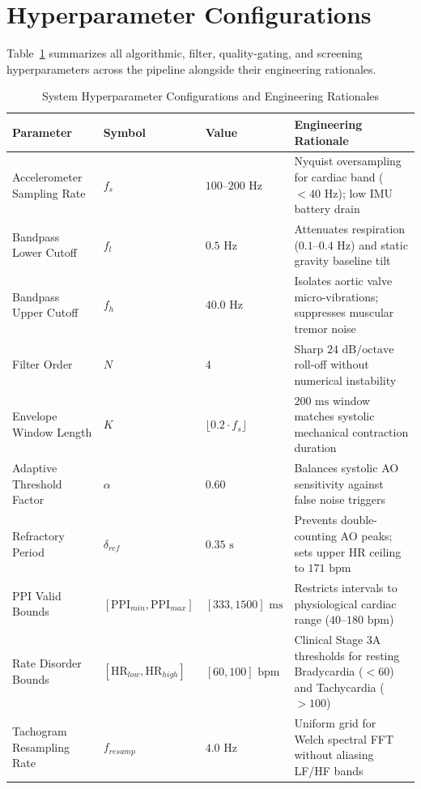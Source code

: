 \section{Hyperparameter Configurations}

Table~\ref{tab:hyperparameters} summarizes all algorithmic, filter, quality-gating, and screening hyperparameters across the pipeline alongside their engineering rationales.

\begin{table}[!htbp]
	\footnotesize
	\sloppy
	\centering
	\caption{System Hyperparameter Configurations and Engineering Rationales}
	\label{tab:hyperparameters}
	\begin{tabular}{|p{2.8cm}|p{1.9cm}|p{2.0cm}|p{5.5cm}|}
		\hline
		\textbf{Parameter} & \textbf{Symbol} & \textbf{Value} & \textbf{Engineering Rationale} \\ \hline
		Accelerometer Sampling Rate & $f_s$ & $100\text{--}200\text{ Hz}$ & Nyquist oversampling for cardiac band ($< 40\text{ Hz}$); low IMU battery drain \\ \hline
		Bandpass Lower Cutoff & $f_l$ & $0.5\text{ Hz}$ & Attenuates respiration ($0.1\text{--}0.4\text{ Hz}$) and static gravity baseline tilt \\ \hline
		Bandpass Upper Cutoff & $f_h$ & $40.0\text{ Hz}$ & Isolates aortic valve micro-vibrations; suppresses muscular tremor noise \\ \hline
		Filter Order & $N$ & $4$ & Sharp $24\text{ dB/octave}$ roll-off without numerical instability \\ \hline
		Envelope Window Length & $K$ & $\lfloor 0.2 \cdot f_s \rfloor$ & $200\text{ ms}$ window matches systolic mechanical contraction duration \\ \hline
		Adaptive Threshold Factor & $\alpha$ & $0.60$ & Balances systolic AO sensitivity against false noise triggers \\ \hline
		Refractory Period & $\delta_{ref}$ & $0.35\text{ s}$ & Prevents double-counting AO peaks; sets upper HR ceiling to $171\text{ bpm}$ \\ \hline
		PPI Valid Bounds & $[\text{PPI}_{min}, \text{PPI}_{max}]$ & $[333, 1500]\text{ ms}$ & Restricts intervals to physiological cardiac range ($40\text{--}180\text{ bpm}$) \\ \hline
		Rate Disorder Bounds & $[\text{HR}_{low}, \text{HR}_{high}]$ & $[60, 100]\text{ bpm}$ & Clinical Stage 3A thresholds for resting Bradycardia ($<60$) and Tachycardia ($>100$) \\ \hline
		Tachogram Resampling Rate & $f_{resamp}$ & $4.0\text{ Hz}$ & Uniform grid for Welch spectral FFT without aliasing LF/HF bands \\ \hline

\end{tabular}
\end{table}
